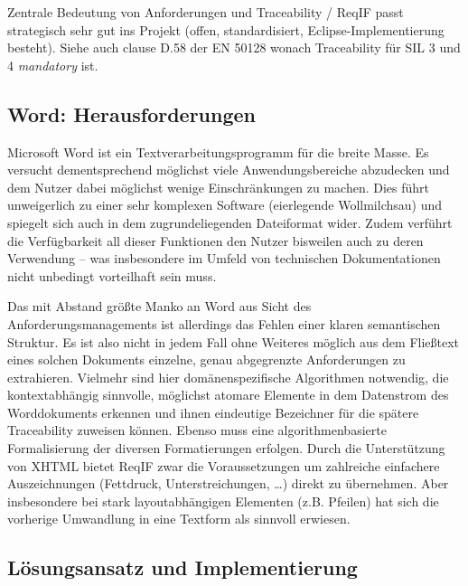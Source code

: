 \documentclass[twoside]{article}
\begin{document}
\begin{multicols}{2}
Zentrale Bedeutung von Anforderungen und Traceability / ReqIF passt strategisch sehr gut ins Projekt (offen, standardisiert, Eclipse-Implementierung besteht).
Siehe auch clause D.58 der EN 50128 wonach Traceability für SIL 3 und 4 \emph{mandatory} ist.

\subsection{Word: Herausforderungen}

Microsoft Word ist ein Textverarbeitungsprogramm für die breite Masse. Es versucht dementsprechend möglichst viele Anwendungsbereiche abzudecken und dem Nutzer dabei möglichst wenige Einschränkungen zu machen. Dies führt unweigerlich zu einer sehr komplexen Software (\glqq eierlegende Wollmilchsau\grqq ) und spiegelt sich auch in dem zugrundeliegenden Dateiformat wider. Zudem verführt die Verfügbarkeit all dieser Funktionen den Nutzer bisweilen auch zu deren Verwendung -- was insbesondere im Umfeld von technischen Dokumentationen nicht unbedingt vorteilhaft sein muss.

Das mit Abstand größte Manko an Word aus Sicht des Anforderungsmanagements ist allerdings das Fehlen einer klaren semantischen Struktur. Es ist also nicht in jedem Fall ohne Weiteres möglich aus dem Fließtext eines solchen Dokuments einzelne, genau abgegrenzte Anforderungen zu extrahieren. Vielmehr sind hier domänenspezifische Algorithmen notwendig, die kontextabhängig sinnvolle, möglichst atomare Elemente in dem Datenstrom des Worddokuments erkennen und ihnen eindeutige Bezeichner für die spätere Traceability zuweisen können. Ebenso muss eine algorithmenbasierte Formalisierung der diversen Formatierungen erfolgen. Durch die Unterstützung von XHTML bietet ReqIF zwar die Voraussetzungen um zahlreiche einfachere Auszeichnungen (Fettdruck, Unterstreichungen, \ldots ) direkt zu übernehmen. Aber insbesondere bei stark layoutabhängigen Elementen (z.B. Pfeilen) hat sich die vorherige Umwandlung in eine Textform als sinnvoll erwiesen.

\subsection{Lösungsansatz und Implementierung}


\end{multicols}
\end{document}
